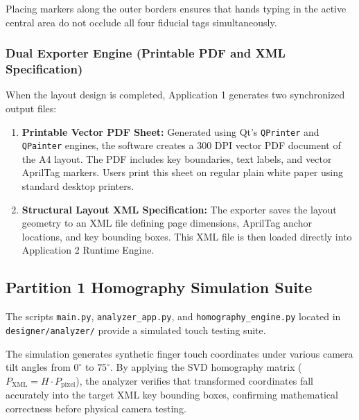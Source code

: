 Placing markers along the outer borders ensures that hands typing in the active central area do not occlude all four fiducial tags simultaneously.

\subsubsection{Dual Exporter Engine (Printable PDF and XML Specification)}
When the layout design is completed, Application 1 generates two synchronized output files:
\begin{enumerate}
    \item \textbf{Printable Vector PDF Sheet:} Generated using Qt's \texttt{QPrinter} and \texttt{QPainter} engines, the software creates a 300 DPI vector PDF document of the A4 layout. The PDF includes key boundaries, text labels, and vector AprilTag markers. Users print this sheet on regular plain white paper using standard desktop printers.
    \item \textbf{Structural Layout XML Specification:} The exporter saves the layout geometry to an XML file defining page dimensions, AprilTag anchor locations, and key bounding boxes. This XML file is then loaded directly into Application 2 Runtime Engine.
\end{enumerate}

\subsection{Partition 1 Homography Simulation Suite}
The scripts \texttt{main.py}, \texttt{analyzer\_app.py}, and \texttt{homography\_engine.py} located in \texttt{designer/analyzer/} provide a simulated touch testing suite.

The simulation generates synthetic finger touch coordinates under various camera tilt angles from $0^\circ$ to $75^\circ$. By applying the SVD homography matrix ($P_{\text{XML}} = H \cdot P_{\text{pixel}}$), the analyzer verifies that transformed coordinates fall accurately into the target XML key bounding boxes, confirming mathematical correctness before physical camera testing.

